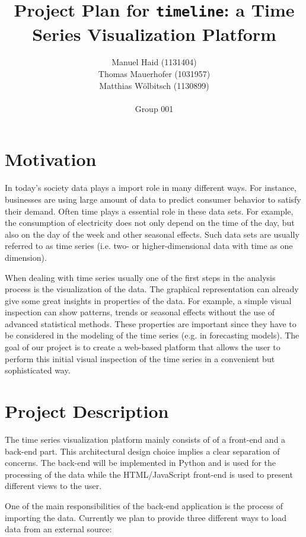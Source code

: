 \documentclass[12pt, a4paper]{article}
\author{Manuel Haid (1131404) \\ Thomas Mauerhofer (1031957) \\ Matthias Wölbitsch (1130899) \\ \\ Group 001}
\title{Project Plan for \texttt{timeline}: a Time Series Visualization Platform}
\date{}
\begin{document}
\maketitle


\section{Motivation}

In today's society data plays a import role in many different ways.
For instance, businesses are using large amount of data to predict consumer behavior to satisfy their demand.
Often time plays a essential role in these data sets. 
For example, the consumption of electricity does not only depend on the time of the day, but also on the day of the week and other seasonal effects.
Such data sets are usually referred to as time series (i.e. two- or higher-dimensional data with time as one dimension). 

When dealing with time series usually one of the first steps in the analysis process is the visualization of the data.
The graphical representation can already give some great insights in properties of the data.
For example, a simple visual inspection can show patterns, trends or seasonal effects without the use of advanced statistical methods. 
These properties are important since they have to be considered in the modeling of the time series (e.g. in forecasting models).
The goal of our project is to create a web-based platform that allows the user to perform this initial visual inspection of the time series in a convenient but sophisticated way.


\section{Project Description}

The time series visualization platform mainly consists of of a front-end and a back-end part.
This architectural design choice implies a clear separation of concerns. 
The back-end will be implemented in Python and is used for the processing of the data while the HTML/JavaScript front-end is used to present different views to the user.

One of the main responsibilities of the back-end application is the process of importing the data.
Currently we plan to provide three different ways to load data from an external source:
\end{document}
